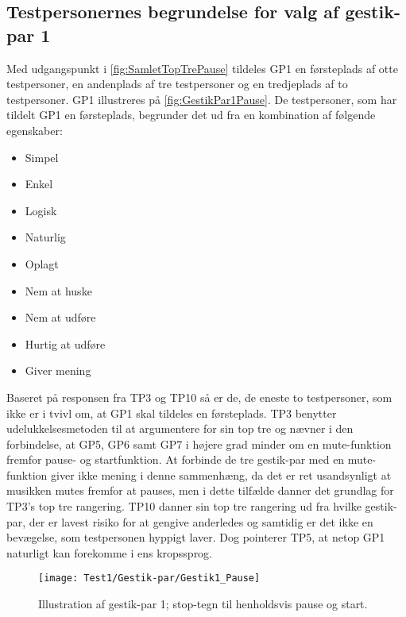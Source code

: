 \subsection{Testpersonernes begrundelse for valg af gestik-par 1}
\label{TestresultaterValgAfGestikkerBegrundelseGP1}
%
Med udgangspunkt i \autoref{fig:SamletTopTrePause} tildeles GP1 en førsteplads af otte testpersoner, en andenplads af tre testpersoner og en tredjeplads af to testpersoner. GP1 illustreres på \autoref{fig:GestikPar1Pause}. De testpersoner, som har tildelt GP1 en førsteplads, begrunder det ud fra en kombination af følgende egenskaber: 
%
\begin{multicols}{3}
    \begin{itemize}
        \item Simpel
        \item Enkel
        \item Logisk
        \item Naturlig
        \item Oplagt
        \item Nem at huske
        \item Nem at udføre
        \item Hurtig at udføre
        \item Giver mening
\end{itemize}
\end{multicols}
\noindent
%
Baseret på responsen fra TP3 og TP10 så er de, de eneste to testpersoner, som ikke er i tvivl om, at GP1 skal tildeles en førsteplads. TP3 benytter udelukkelsesmetoden til at argumentere for sin top tre og nævner i den forbindelse, at GP5, GP6 samt GP7 i højere grad minder om en mute-funktion fremfor pause- og startfunktion. At forbinde de tre gestik-par med en mute-funktion giver ikke mening i denne sammenhæng, da det er ret usandsynligt at musikken mutes fremfor at pauses, men i dette tilfælde danner det grundlag for TP3's top tre rangering. TP10 danner sin top tre rangering ud fra hvilke gestik-par, der er lavest risiko for at gengive anderledes og samtidig er det ikke en bevægelse, som testpersonen hyppigt laver. Dog pointerer TP5, at netop GP1 naturligt kan forekomme i ens kropssprog.
%
\begin{figure}[H]
	\centering
	\texttt{[image: Test1/Gestik-par/Gestik1\_Pause]}
	\caption{Illustration af gestik-par 1; stop-tegn til henholdsvis pause og start.}
	\label{fig:GestikPar1Pause}
\end{figure}
\noindent
%
